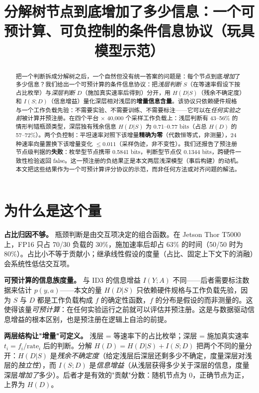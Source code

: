 \documentclass[10pt]{article}
\title{分解树节点到底增加了多少信息：一个可预计算、可负控制的条件信息协议（玩具模型示范）}
\begin{document}
\maketitle

\begin{abstract}
把一个判断拆成分解树之后，一个自然但没有统一答案的问题是：每个节点到底\emph{增加}了多少信息？我们给出一个可预计算的条件信息协议：把\emph{浅层判断} $S$（在等速率假设下按占比枚举）与\emph{深层判断} $D$（施加真实速率后得到）分开，用 $H(D|S)$（残余不确定度）和 $I(S;D)$（信息增益）量化深层相对浅层的\textbf{增量信息含量}。该协议只依赖硬件规格与一个工作负载先验：不需要实验、不需要训练、不需要标注——它可以在\emph{任何实验之前}被计算并预注册。在四个平台 × 40,000 个采样工作负载上：浅层判断有 43--56\% 的情形判错瓶颈类型，深层独有残余信息 $H(D|S)$ 为 0.71--0.77 bits（占总 $H(D)$ 的 57--72\%）。两个负控制：平坦速率对照下该增量\textbf{精确为零}（代数恒等式，非测量），24 种速率向量置换下该增量变化 $\leq 0.011$（采样伪迹，非不变性）。我们还报告了预注册节点级判据的\textbf{失败}：枚举型节点携带 0.5841 bits，判断型节点仅 0.1344 bits，跨硬件一致性检验返回 false。这一预注册的负结果正是本文两层浅深模型（事后构建）的动机。本文把这些结果作为一个可预计算评分协议的示范，而非任何方法或对齐问题的解法。
\end{abstract}

\section{为什么是这个量}\label{why-this-quantity}

\textbf{占比归因不够。} 瓶颈判断是由交互项决定的组合函数。在 Jetson Thor T5000 上，FP16 只占 70/30 负载的 30\%，施加速率后却占 63\% 的时间（50/50 时为 80\%）。占比小不等于贡献小；继承线性假设的度量（占比、固定上下文下的消融）会系统性低估交互项。

\textbf{可预计算的信息族度量。} 与 ID3 的信息增益 $I(Y;A)$ 不同——后者需要标注数据来估计 $p(y,a)$——本文的量 $H(D|S)$ 只依赖硬件规格与工作负载先验，因为 $S$ 与 $D$ 都是工作负载构成 $f$ 的确定性函数，$f$ 的分布是假设的而非测量的。这使得该量\emph{可预计算}：在任何实验运行之前就可以评估并预注册。这是与数据驱动信息增益的根本区别，也是预注册在逻辑上自洽的前提。

\textbf{两层结构让"增量"可定义。} 浅层 = 等速率下的占比枚举；深层 = 施加真实速率 $t_i=f_i/\mathrm{rate}_i$ 后的判断。分解 $H(D)=H(D|S)+I(S;D)$ 把两个不同的量分开：$H(D|S)$ 是\emph{残余不确定度}（给定浅层后深层还剩多少不确定，度量深层对浅层的\emph{独立性}），而 $I(S;D)$ 是\emph{信息增益}（从浅层获得多少关于深层的信息，度量深层\emph{增加了}多少）。后者才是有效的"贡献"分数：随机节点为 0，正确节点为正，上界为 $H(D)$。
\end{document}
